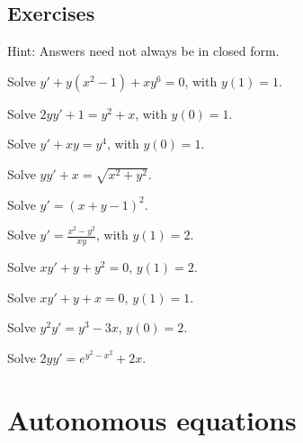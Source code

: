 \subsection{Exercises}

Hint: Answers need not always be in closed form.

\begin{exercise}
Solve
$y'+ y(x^2-1)+xy^6 = 0$, with $y(1)=1$.
\end{exercise}

\begin{exercise}
Solve $2yy' + 1 = y^2 + x$, with $y(0)=1$.
\end{exercise}

\begin{exercise}
Solve $y' + xy = y^4$, with $y(0)=1$.
\end{exercise}

\begin{exercise}
Solve $yy' + x = \sqrt{x^2 + y^2}$.
\end{exercise}

\begin{exercise}
Solve $y' = {(x+y-1)}^2$.
\end{exercise}

\begin{exercise}
Solve $y' = \frac{x^2-y^2}{x y}$, with $y(1) = 2$.
\end{exercise}

\setcounter{exercise}{100}

\begin{exercise}
Solve $xy'+y+y^2 = 0$, $y(1)=2$.
\end{exercise}

\begin{exercise}
Solve $xy'+y +x = 0$, $y(1)=1$.
\end{exercise}

\begin{exercise}
Solve $y^2y' = y^3-3x$, $y(0)=2$.
\end{exercise}

\begin{exercise}
Solve $2yy' = e^{y^2-x^2} + 2x$.
\end{exercise}


\sectionnewpage
\section{Autonomous equations}
\label{auteq:section}

